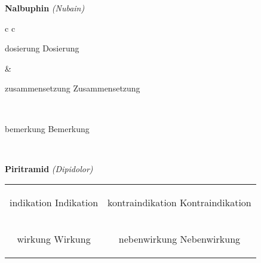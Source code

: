 \documentclass[12pt]{beamer}
\begin{document}
\begin{frame}{
    \textbf{Nalbuphin}
    \textit{(Nubain)}
}
    \begin{tabular}{c c}
        \begin{beamercolorbox}[wd=\boxwidth\textwidth,ht=\boxheight\textheight,sep=1em]{dosierung}
        Dosierung
        \end{beamercolorbox} & 
        \begin{beamercolorbox}[wd=\boxwidth\textwidth,ht=\boxheight\textheight,sep=1em]{zusammensetzung}
        Zusammensetzung
        \end{beamercolorbox} \\
        \begin{beamercolorbox}[wd=\textwidth,ht=\boxheight\textheight,sep=1em]{bemerkung}
        Bemerkung
        \end{beamercolorbox} \\
    \end{tabular}
\end{frame}

\begin{frame}{
    \textbf{Piritramid}
    \textit{(Dipidolor)}
}
    \begin{tabular}{c c}
        \begin{beamercolorbox}[wd=\boxwidth\textwidth,ht=\boxheight\textheight,sep=1em]{indikation}
        Indikation
        \end{beamercolorbox} & 
        \begin{beamercolorbox}[wd=\boxwidth\textwidth,ht=\boxheight\textheight,sep=1em]{kontraindikation}
        Kontraindikation 
        \end{beamercolorbox} \\
        \begin{beamercolorbox}[wd=\boxwidth\textwidth,ht=\boxheight\textheight,sep=1em]{wirkung}
        Wirkung
        \end{beamercolorbox} & 
        \begin{beamercolorbox}[wd=\boxwidth\textwidth,ht=\boxheight\textheight,sep=1em]{nebenwirkung}
        Nebenwirkung
        \end{beamercolorbox} \\
    \end{tabular}
\end{frame}
\end{document}

